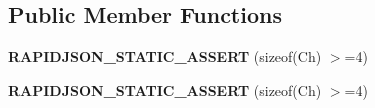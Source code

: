 \subsection*{Public Member Functions}
\begin{DoxyCompactItemize}
\item 
{\bfseries R\+A\+P\+I\+D\+J\+S\+O\+N\+\_\+\+S\+T\+A\+T\+I\+C\+\_\+\+A\+S\+S\+E\+RT} (sizeof(Ch) $>$=4)\hypertarget{struct_u_t_f32_aae11b766f799d311679d59e9f7077f83}{}\label{struct_u_t_f32_aae11b766f799d311679d59e9f7077f83}

\item 
{\bfseries R\+A\+P\+I\+D\+J\+S\+O\+N\+\_\+\+S\+T\+A\+T\+I\+C\+\_\+\+A\+S\+S\+E\+RT} (sizeof(Ch) $>$=4)\hypertarget{struct_u_t_f32_aae11b766f799d311679d59e9f7077f83}{}\label{struct_u_t_f32_aae11b766f799d311679d59e9f7077f83}

\end{DoxyCompactItemize}
